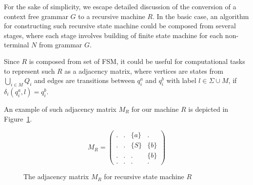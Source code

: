 For the sake of simplicity, we escape detailed discussion of the conversion of a context free grammar $G$ to a recursive machine $R$. In the basic case, an algorithm for constructing such recursive state machine could be composed from several stages, where each stage involves building of finite state machine for each non-terminal $N$ from grammar $G$. 

Since $R$ is composed from set of FSM, it could be useful for computational tasks to represent such $R$ as a adjacency matrix, where vertices are states from $\bigcup_{i \in M}Q_i$ and edges are transitions between $q_i^a$ and $q_i^b$ with label $l \in \Sigma \cup M$, if $\delta_i (q_i^a, l) = q_i^b$.

An example of such adjacency matrix $M_R$ for our machine $R$ is depicted in Figure~\ref{example:adjacency:for:R}.

\begin{figure}[h]
    $$
    M_R =
    \begin{pmatrix}
    . & . & \{a\} & .     \\
    . & . & \{S\} & \{b\} \\
    . & . & . & \{b\}     \\
    . & . & . & .
    \end{pmatrix}
    $$
    \centering
    \caption{The adjacency matrix $M_R$ for recursive state machine $R$}
    \label{example:adjacency:for:R}
\end{figure}

